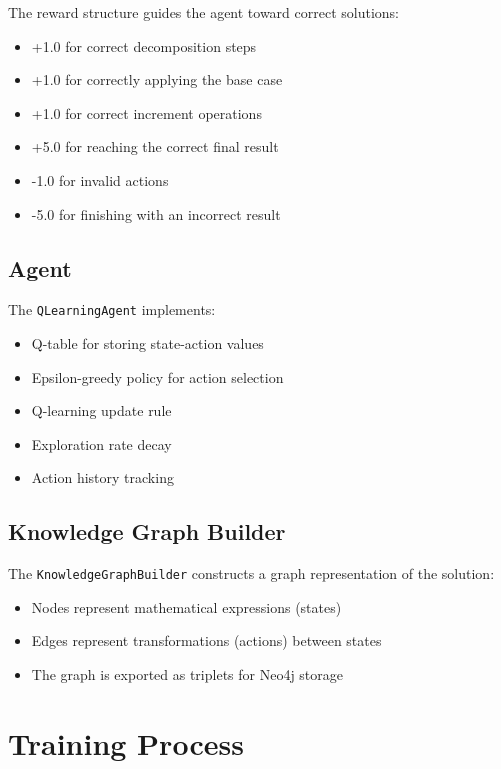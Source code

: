 \documentclass{article}
\begin{document}
The reward structure guides the agent toward correct solutions:
\begin{itemize}
    \item +1.0 for correct decomposition steps
    \item +1.0 for correctly applying the base case
    \item +1.0 for correct increment operations
    \item +5.0 for reaching the correct final result
    \item -1.0 for invalid actions
    \item -5.0 for finishing with an incorrect result
\end{itemize}

\subsection{Agent}

The \texttt{QLearningAgent} implements:
\begin{itemize}
    \item Q-table for storing state-action values
    \item Epsilon-greedy policy for action selection
    \item Q-learning update rule
    \item Exploration rate decay
    \item Action history tracking
\end{itemize}

\subsection{Knowledge Graph Builder}

The \texttt{KnowledgeGraphBuilder} constructs a graph representation of the solution:
\begin{itemize}
    \item Nodes represent mathematical expressions (states)
    \item Edges represent transformations (actions) between states
    \item The graph is exported as triplets for Neo4j storage
\end{itemize}

\section{Training Process}
\end{document}

